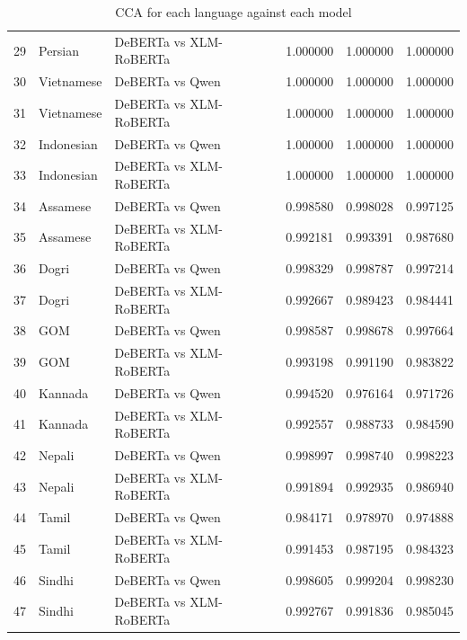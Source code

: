 \documentclass[11pt]{article} %
\begin{document}
\begin{table}
\begin{tabular}{lllrrr}
            29         & Persian    & DeBERTa vs XLM-RoBERTa & 1.000000    & 1.000000    & 1.000000    \\
            30         & Vietnamese & DeBERTa vs Qwen        & 1.000000    & 1.000000    & 1.000000    \\
            31         & Vietnamese & DeBERTa vs XLM-RoBERTa & 1.000000    & 1.000000    & 1.000000    \\
            32         & Indonesian & DeBERTa vs Qwen        & 1.000000    & 1.000000    & 1.000000    \\
            33         & Indonesian & DeBERTa vs XLM-RoBERTa & 1.000000    & 1.000000    & 1.000000    \\
            34         & Assamese   & DeBERTa vs Qwen        & 0.998580    & 0.998028    & 0.997125    \\
            35         & Assamese   & DeBERTa vs XLM-RoBERTa & 0.992181    & 0.993391    & 0.987680    \\
            36         & Dogri      & DeBERTa vs Qwen        & 0.998329    & 0.998787    & 0.997214    \\
            37         & Dogri      & DeBERTa vs XLM-RoBERTa & 0.992667    & 0.989423    & 0.984441    \\
            38         & GOM        & DeBERTa vs Qwen        & 0.998587    & 0.998678    & 0.997664    \\
            39         & GOM        & DeBERTa vs XLM-RoBERTa & 0.993198    & 0.991190    & 0.983822    \\
            40         & Kannada    & DeBERTa vs Qwen        & 0.994520    & 0.976164    & 0.971726    \\
            41         & Kannada    & DeBERTa vs XLM-RoBERTa & 0.992557    & 0.988733    & 0.984590    \\
            42         & Nepali     & DeBERTa vs Qwen        & 0.998997    & 0.998740    & 0.998223    \\
            43         & Nepali     & DeBERTa vs XLM-RoBERTa & 0.991894    & 0.992935    & 0.986940    \\
            44         & Tamil      & DeBERTa vs Qwen        & 0.984171    & 0.978970    & 0.974888    \\
            45         & Tamil      & DeBERTa vs XLM-RoBERTa & 0.991453    & 0.987195    & 0.984323    \\
            46         & Sindhi     & DeBERTa vs Qwen        & 0.998605    & 0.999204    & 0.998230    \\
            47         & Sindhi     & DeBERTa vs XLM-RoBERTa & 0.992767    & 0.991836    & 0.985045    \\
            \bottomrule
        \end{tabular}
        \caption{CCA for each language against each model}
        \label{tab:cca}
    \end{table}
\end{document}
